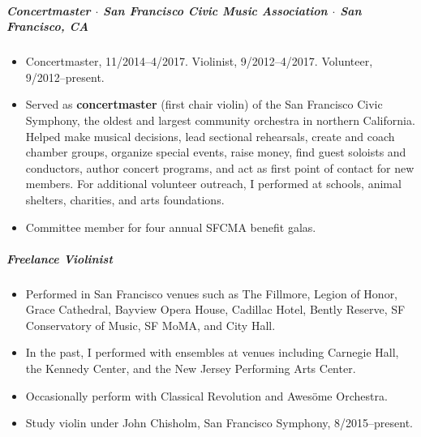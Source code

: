\documentclass[10pt,letterpaper]{article}
\begin{document}
\subparagraph{Concertmaster $\cdot$ San Francisco Civic Music Association $\cdot$ \textnormal{San Francisco, CA}}
\begin{itemize}
    \item Concertmaster, 11/2014--4/2017. Violinist, 9/2012--4/2017. Volunteer, 9/2012--present.
    \item Served as \textbf{concertmaster} (first chair violin) of the San Francisco Civic Symphony, the oldest and largest community orchestra in northern California. Helped make musical decisions, lead sectional rehearsals, create and coach chamber groups, organize special events, raise money, find guest soloists and conductors, author concert programs, and act as first point of contact for new members. For additional volunteer outreach, I performed at schools, animal shelters, charities, and arts foundations.
    \item Committee member for four annual SFCMA benefit galas.
\end{itemize}


\subparagraph{Freelance Violinist}
\begin{itemize}
    \item Performed in San Francisco venues such as The Fillmore, Legion of Honor, Grace Cathedral, Bayview Opera House, Cadillac Hotel, Bently Reserve, SF Conservatory of Music, SF MoMA, and City Hall.
    \item In the past, I performed with ensembles at venues including Carnegie Hall, the Kennedy Center, and the New Jersey Performing Arts Center.
    \item Occasionally perform with Classical Revolution and Awesöme Orchestra.
    \item Study violin under John Chisholm, San Francisco Symphony, 8/2015--present.
\end{itemize}
\end{document}
